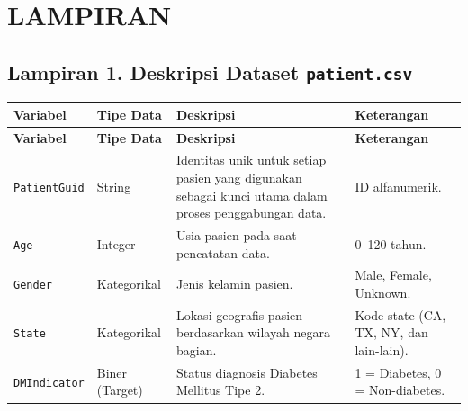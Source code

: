 \clearpage
\chapter*{LAMPIRAN}

\section*{Lampiran 1. Deskripsi Dataset \texttt{patient.csv}}
\label{app:patient}
\setlength{\tabcolsep}{3pt}
\begin{longtable}{|L{2.5cm}|C{1.8cm}|L{5.3cm}|L{3.5cm}|}
\hline
\textbf{Variabel} & \textbf{Tipe Data} & \textbf{Deskripsi} & \textbf{Keterangan}\\ \hline
\endfirsthead
\hline
\textbf{Variabel} & \textbf{Tipe Data} & \textbf{Deskripsi} & \textbf{Keterangan}\\ \hline
\endhead
\texttt{PatientGuid} & String & Identitas unik untuk setiap pasien yang digunakan sebagai kunci utama dalam proses penggabungan data. & ID alfanumerik.\\ \hline
\texttt{Age} & Integer & Usia pasien pada saat pencatatan data. & 0--120 tahun.\\ \hline
\texttt{Gender} & Kategorikal & Jenis kelamin pasien. & Male, Female, Unknown.\\ \hline
\texttt{State} & Kategorikal & Lokasi geografis pasien berdasarkan wilayah negara bagian. & Kode state (CA, TX, NY, dan lain-lain).\\ \hline
\texttt{DMIndicator} & Biner (Target) & Status diagnosis Diabetes Mellitus Tipe 2. & 1 = Diabetes, 0 = Non-diabetes.\\ \hline
\end{longtable}

